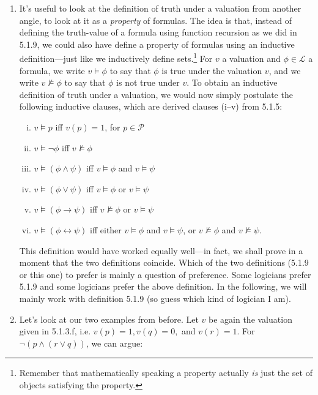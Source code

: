 \begin{enumerate}[\thesection.1]
		\item It's useful to look at the definition of truth under a valuation from another angle, to look at it as a \emph{property} of formulas. The idea is that, instead of defining the truth-value of a formula using function recursion as we did in 5.1.9, we could also have define a property of formulas using an inductive definition---just like we inductively define sets.\footnote{Remember that mathematically speaking a property actually \emph{is} just the set of objects satisfying the property.} For $v$ a valuation and $\phi\in\mathcal{L}$ a formula, we write $v\vDash \phi$ to say that $\phi$ is true under the valuation $v$, and we write $v\nvDash\phi$ to say that $\phi$ is not true under $v$. To obtain an inductive definition of truth under a valuation, we would now simply postulate the following inductive clauses, which are derived clauses (i--v) from 5.1.5:
		\begin{enumerate}[(i)]
		
					\item $v\vDash p$ iff $v(p)=1$, for $p\in\mathcal{P}$
				
					\item $v\vDash \neg\phi$ iff $v\nvDash\phi$
					
					\item $v\vDash(\phi\land\psi)$ iff $v\vDash\phi$ and $v\vDash\psi$
					\item $v\vDash(\phi\lor\psi)$ iff $v\vDash\phi$ or $v\vDash\psi$
					\item $v\vDash(\phi\to\psi)$ iff $v\nvDash\phi$ or $v\vDash\psi$
					\item $v\vDash(\phi\leftrightarrow\psi)$ iff   either $v\vDash\phi$ and $v\vDash\psi$, or $v\nvDash\phi$ and $v\nvDash\psi$.
				
				\end{enumerate}
This definition would have worked equally well---in fact, we shall prove in a moment that the two definitions coincide. Which of the two definitions (5.1.9 or this one) to prefer is mainly a question of preference. Some logicians prefer 5.1.9 and some logicians prefer the above definition. In the following, we will mainly work with definition 5.1.9 (so guess which kind of logician I am). 
		
	\item Let's look at our two examples from before. Let $v$ be again the valuation given in 5.1.3.f, i.e. $v(p)=1,v(q)=0,$ and $v(r)=1$. For $\neg (p\land (r\lor q))$, we can argue:
		\begin{itemize}
		

\end{itemize}
\end{enumerate}
